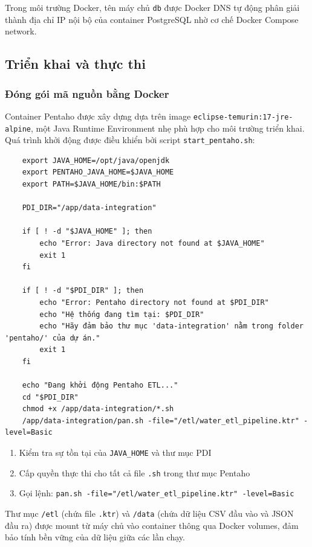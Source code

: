 Trong môi trường Docker, tên máy chủ \texttt{db} được Docker DNS tự động phân giải thành địa chỉ IP nội bộ của container PostgreSQL nhờ cơ chế Docker Compose network.

\subsection{Triển khai và thực thi}

\subsubsection{Đóng gói mã nguồn bằng Docker}

Container Pentaho được xây dựng dựa trên image \texttt{eclipse-temurin:17-jre-alpine}, một Java Runtime Environment nhẹ phù hợp cho môi trường triển khai. Quá trình khởi động được điều khiển bởi script \texttt{start\_pentaho.sh}:
\begin{lstlisting}
    export JAVA_HOME=/opt/java/openjdk
    export PENTAHO_JAVA_HOME=$JAVA_HOME
    export PATH=$JAVA_HOME/bin:$PATH
    
    PDI_DIR="/app/data-integration"
    
    if [ ! -d "$JAVA_HOME" ]; then
        echo "Error: Java directory not found at $JAVA_HOME"
        exit 1
    fi
    
    if [ ! -d "$PDI_DIR" ]; then
        echo "Error: Pentaho directory not found at $PDI_DIR"
        echo "Hệ thống đang tìm tại: $PDI_DIR"
        echo "Hãy đảm bảo thư mục 'data-integration' nằm trong folder 'pentaho/' của dự án."
        exit 1
    fi
    
    echo "Đang khởi động Pentaho ETL..."
    cd "$PDI_DIR"
    chmod +x /app/data-integration/*.sh
    /app/data-integration/pan.sh -file="/etl/water_etl_pipeline.ktr" -level=Basic
\end{lstlisting}

\begin{enumerate}
    \item Kiểm tra sự tồn tại của \texttt{JAVA\_HOME} và thư mục PDI
    \item Cấp quyền thực thi cho tất cả file \texttt{.sh} trong thư mục Pentaho
    \item Gọi lệnh: \verb|pan.sh -file="/etl/water_etl_pipeline.ktr" -level=Basic|
\end{enumerate}

Thư mục \texttt{/etl} (chứa file \texttt{.ktr}) và \texttt{/data} (chứa dữ liệu CSV đầu vào và JSON đầu ra) được mount từ máy chủ vào container thông qua Docker volumes, đảm bảo tính bền vững của dữ liệu giữa các lần chạy.

